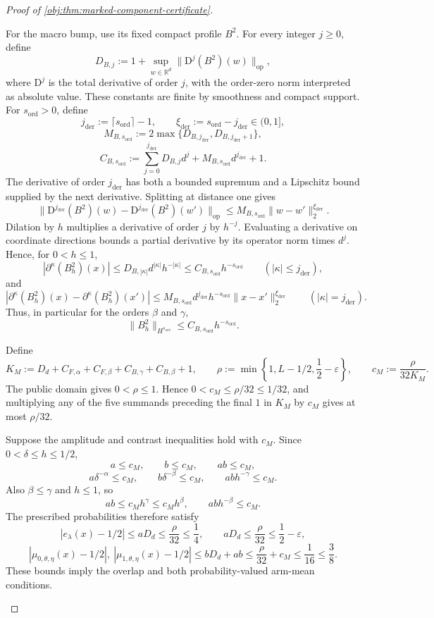 \begin{proof}[Proof of \cref{obj:thm:marked-component-certificate}]
\begin{enumerate}
For the macro bump, use its fixed compact profile \(B^2\). For every integer \(j\ge0\), define
\[
D_{B,j}:=
1+\sup_{w\in\mathbb R^d}\|\mathrm D^j(B^2)(w)\|_{\mathrm{op}},
\]
where \(\mathrm D^j\) is the total derivative of order \(j\), with the order-zero norm interpreted as absolute value. These constants are finite by smoothness and compact support. For \(s_{\mathrm{ord}}>0\), define
\[
j_{\mathrm{der}}:=\lceil s_{\mathrm{ord}}\rceil-1,
\qquad
\xi_{\mathrm{der}}:=s_{\mathrm{ord}}-j_{\mathrm{der}}\in(0,1],
\]
\[
M_{B,s_{\mathrm{ord}}}
:=
2\max\{D_{B,j_{\mathrm{der}}},D_{B,j_{\mathrm{der}}+1}\},
\]
\[
C_{B,s_{\mathrm{ord}}}
:=
\sum_{j=0}^{j_{\mathrm{der}}}D_{B,j}d^j
+
M_{B,s_{\mathrm{ord}}}d^{j_{\mathrm{der}}}+1.
\]
The derivative of order \(j_{\mathrm{der}}\) has both a bounded supremum and a Lipschitz bound supplied by the next derivative. Splitting at distance one gives
\[
\|\mathrm D^{j_{\mathrm{der}}}(B^2)(w)
-\mathrm D^{j_{\mathrm{der}}}(B^2)(w')\|_{\mathrm{op}}
\le
M_{B,s_{\mathrm{ord}}}\|w-w'\|_2^{\xi_{\mathrm{der}}}.
\]
Dilation by \(h\) multiplies a derivative of order \(j\) by \(h^{-j}\). Evaluating a derivative on coordinate directions bounds a partial derivative by its operator norm times \(d^j\). Hence, for \(0<h\le1\),
\[
|\partial^\kappa(B_h^2)(x)|
\le D_{B,|\kappa|}d^{|\kappa|}h^{-|\kappa|}
\le C_{B,s_{\mathrm{ord}}}h^{-s_{\mathrm{ord}}}
\qquad (|\kappa|\le j_{\mathrm{der}}),
\]
and
\[
|\partial^\kappa(B_h^2)(x)-\partial^\kappa(B_h^2)(x')|
\le
M_{B,s_{\mathrm{ord}}}d^{j_{\mathrm{der}}}
h^{-s_{\mathrm{ord}}}\|x-x'\|_2^{\xi_{\mathrm{der}}}
\qquad (|\kappa|=j_{\mathrm{der}}).
\]
Thus, in particular for the orders \(\beta\) and \(\gamma\),
\[
\|B_h^2\|_{H^{s_{\mathrm{ord}}}}
\le C_{B,s_{\mathrm{ord}}}h^{-s_{\mathrm{ord}}}.
\]

Define
\[
K_M:=
D_d+C_{F,\alpha}+C_{F,\beta}
+C_{B,\gamma}+C_{B,\beta}+1,
\qquad
\rho:=\min\left\{1,L-1/2,\frac12-\varepsilon\right\},
\qquad
c_M:=\frac{\rho}{32K_M}.
\]
The public domain gives \(0<\rho\le1\). Hence \(0<c_M\le\rho/32\le1/32\), and multiplying any of the five summands preceding the final \(1\) in \(K_M\) by \(c_M\) gives at most \(\rho/32\).

Suppose the amplitude and contrast inequalities hold with \(c_M\). Since \(0<\delta\le h\le1/2\),
\[
a\le c_M,\qquad b\le c_M,\qquad ab\le c_M,
\]
\[
a\delta^{-\alpha}\le c_M,\qquad
b\delta^{-\beta}\le c_M,\qquad
ab h^{-\gamma}\le c_M.
\]
Also \(\beta\le\gamma\) and \(h\le1\), so
\[
ab\le c_Mh^\gamma\le c_Mh^\beta,
\qquad
ab h^{-\beta}\le c_M.
\]
The prescribed probabilities therefore satisfy
\[
|e_\lambda(x)-1/2|
\le aD_d\le\frac{\rho}{32}\le\frac14,
\qquad
aD_d\le\frac{\rho}{32}\le\frac12-\varepsilon,
\]
\[
|\mu_{0,\theta,\eta}(x)-1/2|,
\ |\mu_{1,\theta,\eta}(x)-1/2|
\le bD_d+ab
\le\frac{\rho}{32}+c_M\le\frac1{16}\le\frac38.
\]
These bounds imply the overlap and both probability-valued arm-mean conditions.


\end{enumerate}
\end{proof}
